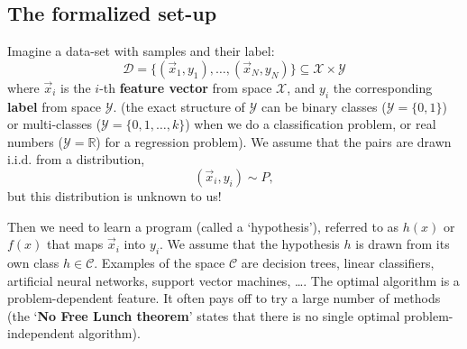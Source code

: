 \documentclass{article}
\begin{document}
\subsection{The formalized set-up}
Imagine a data-set with samples and their label:
\begin{equation}
    \mathcal{D} = \Bigg\{ (\vec{x}_1,y_1), \dots, (\vec{x}_N,y_N) \Bigg\} \subseteq \mathcal{X}\times\mathcal{Y}
\end{equation}
where $\vec{x}_i$ is the $i$-th \textbf{feature vector} from space $\mathcal{X}$, and $y_i$ the corresponding \textbf{label} from space $\mathcal{Y}$. (the exact structure of $\mathcal{Y}$ can be binary classes ($\mathcal{Y}=\{0,1\}$) or multi-classes ($\mathcal{Y}=\{0,1,\dots,k\}$) when we do a classification problem, or real numbers ($\mathcal{Y}=\mathbb{R}$) for a regression problem). We assume that the pairs are drawn i.i.d. from a distribution,
\begin{equation}
    (\vec{x}_i,y_i) \sim P,
\end{equation}
but this distribution is unknown to us!

Then we need to learn a program (called a `hypothesis'), referred to as $h(x)$ or $f(x)$ that maps $\vec{x}_i$ into $y_i$. We assume that the hypothesis $h$ is drawn from its own class $h\in\mathcal{C}$. Examples of the space $\mathcal{C}$ are decision trees, linear classifiers, artificial neural networks, support vector machines, \dots. The optimal algorithm is a problem-dependent feature. It often pays off to try a large number of methods (the `\textbf{No Free Lunch theorem}' states that there is no single optimal problem-independent algorithm).
\end{document}
